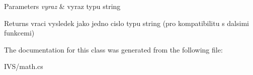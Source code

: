 \begin{DoxyParams}{Parameters}
{\em vyraz} & vyraz typu string\\
\hline
\end{DoxyParams}
\begin{DoxyReturn}{Returns}
vraci vysledek jako jedno cislo typu string (pro kompatibilitu s dalsimi funkcemi)
\end{DoxyReturn}


The documentation for this class was generated from the following file\+:\begin{DoxyCompactItemize}
\item 
I\+V\+S/math.\+cs\end{DoxyCompactItemize}

